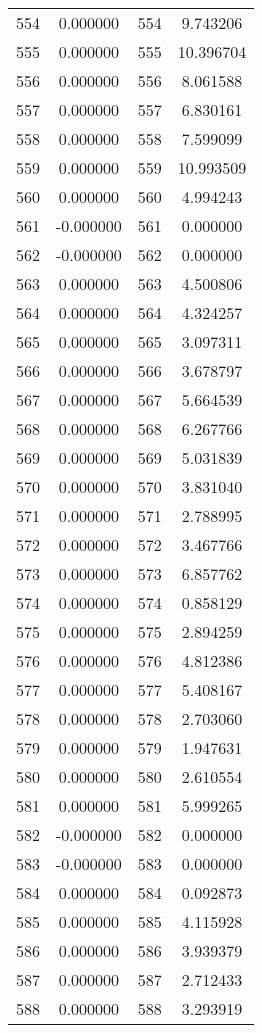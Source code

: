 \documentclass[12pt]{article}
\begin{document}
\begin{longtable}{@{}cccc@{}}
554 & 0.000000 & 554 & 9.743206 \\
555 & 0.000000 & 555 & 10.396704 \\
556 & 0.000000 & 556 & 8.061588 \\
557 & 0.000000 & 557 & 6.830161 \\
558 & 0.000000 & 558 & 7.599099 \\
559 & 0.000000 & 559 & 10.993509 \\
560 & 0.000000 & 560 & 4.994243 \\
561 & -0.000000 & 561 & 0.000000 \\
562 & -0.000000 & 562 & 0.000000 \\
563 & 0.000000 & 563 & 4.500806 \\
564 & 0.000000 & 564 & 4.324257 \\
565 & 0.000000 & 565 & 3.097311 \\
566 & 0.000000 & 566 & 3.678797 \\
567 & 0.000000 & 567 & 5.664539 \\
568 & 0.000000 & 568 & 6.267766 \\
569 & 0.000000 & 569 & 5.031839 \\
570 & 0.000000 & 570 & 3.831040 \\
571 & 0.000000 & 571 & 2.788995 \\
572 & 0.000000 & 572 & 3.467766 \\
573 & 0.000000 & 573 & 6.857762 \\
574 & 0.000000 & 574 & 0.858129 \\
575 & 0.000000 & 575 & 2.894259 \\
576 & 0.000000 & 576 & 4.812386 \\
577 & 0.000000 & 577 & 5.408167 \\
578 & 0.000000 & 578 & 2.703060 \\
579 & 0.000000 & 579 & 1.947631 \\
580 & 0.000000 & 580 & 2.610554 \\
581 & 0.000000 & 581 & 5.999265 \\
582 & -0.000000 & 582 & 0.000000 \\
583 & -0.000000 & 583 & 0.000000 \\
584 & 0.000000 & 584 & 0.092873 \\
585 & 0.000000 & 585 & 4.115928 \\
586 & 0.000000 & 586 & 3.939379 \\
587 & 0.000000 & 587 & 2.712433 \\
588 & 0.000000 & 588 & 3.293919 \\

\end{longtable}
\end{document}
